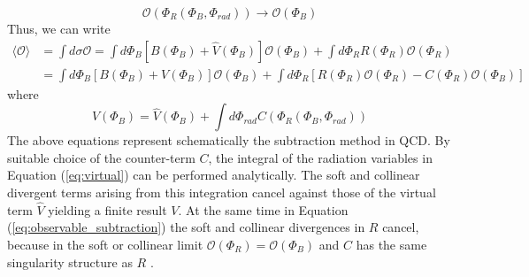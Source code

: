 \begin{equation}
    \mathscr{O}(\Phi_R(\Phi_B,\Phi_{rad})) \rightarrow \mathscr{O}(\Phi_B)
\end{equation}
Thus, we can write
\begin{equation} \label{eq:observable_subtraction}
    \begin{aligned}
        \langle\mathscr{O}\rangle &= \int d\sigma \mathscr{O} = \int d\Phi_B[B(\Phi_B) + \hat{V}(\Phi_B)]\mathscr{O}(\Phi_B) + \int d\Phi_R R(\Phi_R) \mathscr{O}(\Phi_R) \\
        &= \int d\Phi_B[B(\Phi_B) + V(\Phi_B)]\mathscr{O}(\Phi_B) + \int d\Phi_R [R(\Phi_R)\mathscr{O}(\Phi_R) - C(\Phi_R)\mathscr{O}(\Phi_B)]
    \end{aligned}
\end{equation}
where 
\begin{equation}\label{eq:virtual}
    V(\Phi_B) = \hat{V}(\Phi_B) + \int d\Phi_{rad} C(\Phi_R(\Phi_B, \Phi_{rad}))
\end{equation}
The above equations represent schematically the subtraction method in QCD. By suitable choice of the counter-term $C$, the integral of the radiation variables in Equation (\ref{eq:virtual})
can be performed analytically. The soft and collinear divergent terms arising from this integration cancel against those of the virtual term $\hat{V}$ yielding a finite result $V$. At the same time in Equation (\ref{eq:observable_subtraction}) the soft and collinear divergences in $R$ cancel, because in the soft or collinear limit $\mathscr{O}(\Phi_R) = \mathscr{O}(\Phi_B)$ and $C$ has the same singularity structure as $R$ \cite{Nason:2012pr}.

